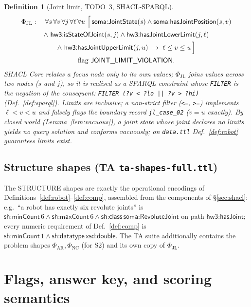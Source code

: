 \documentclass[11pt,a4paper]{article}
\newtheorem{definition}{Definition}[section]
\newcommand{\IRI}[1]{\textsf{#1}}                    %
\newcommand{\dbl}{\IRI{xsd{:}double}}
\begin{document}
\begin{definition}[Joint limit, TODO~3, SHACL-SPARQL]\label{def:jl}
\begin{gather*}
  \Phi_{\mathrm{JL}}:\quad
  \forall s\,\forall v\,\forall j\,\forall \ell\,\forall u\
  \Bigl[\, \IRI{soma{:}JointState}(s) \wedge \IRI{soma{:}hasJointPosition}(s,v) \\
  \wedge\ \IRI{hw3{:}isStateOfJoint}(s,j)
  \wedge \IRI{hw3{:}hasJointLowerLimit}(j,\ell) \\
  \wedge\ \IRI{hw3{:}hasJointUpperLimit}(j,u)
  \;\rightarrow\; \ell \le v \le u \,\Bigr] \\
  \text{flag \textsf{JOINT\_LIMIT\_VIOLATION}}.
\end{gather*}
SHACL Core relates a focus node only to its own values; $\Phi_{\mathrm{JL}}$
joins values across two nodes ($s$ and $j$), so it is realised as a SPARQL
constraint whose \texttt{FILTER} is the negation of the consequent:
\texttt{FILTER (?v < ?lo || ?v > ?hi)} (Def.~\ref{def:sparql}). Limits are
inclusive; a non-strict filter (\texttt{<=}, \texttt{>=}) implements
$\ell < v < u$ and falsely flags the boundary record \texttt{jl\_case\_02}
($v = u$ exactly). By closed world (Lemma~\ref{lem:vacuous}), a joint state whose
joint declares no limits yields no query solution and conforms vacuously; on
\texttt{data.ttl} Def.~\ref{def:robot} guarantees limits exist.
\end{definition}

\subsection{Structure shapes (TA \texttt{ta-shapes-full.ttl})}\label{sec:structure}

The \textsf{STRUCTURE} shapes are exactly the operational encodings of
Definitions~\ref{def:robot}--\ref{def:comp}, assembled from the components of
\S\ref{sec:shacl}: e.g.\ ``a robot has exactly six revolute joints'' is
$\IRI{sh{:}minCount}\,6 \wedge \IRI{sh{:}maxCount}\,6 \wedge \IRI{sh{:}class}\,
\IRI{soma{:}RevoluteJoint}$ on path $\IRI{hw3{:}hasJoint}$; every numeric
requirement of Def.~\ref{def:comp} is $\IRI{sh{:}minCount}\,1 \wedge
\IRI{sh{:}datatype}\,\dbl$. The TA suite additionally contains the problem
shapes $\Phi_{\mathrm{AR}}, \Phi_{\mathrm{NC}}$ (for S2) and its own copy of
$\Phi_{\mathrm{JL}}$.

\section{Flags, answer key, and scoring semantics}\label{sec:scoring}
\end{document}
